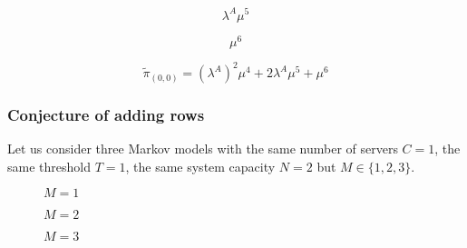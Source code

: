 \begin{multicols}{4}
    \begin{figure}[H]
        \centering
        \scalebox{0.6}{}
    \end{figure}
    \vspace*{\fill}
    \columnbreak
    \vspace*{0.3cm}
    \begin{equation*}
        \lambda^A \mu^5
    \end{equation*}
    \vspace*{\fill}
    \columnbreak
    \begin{figure}[H]
        \centering
        \scalebox{0.6}{}
    \end{figure}
    \vspace*{\fill}
    \columnbreak
    \vspace*{0.3cm}
    \begin{equation*}
        \mu^6
    \end{equation*}
\end{multicols}


\begin{equation*}
    \tilde{\pi}_{(0,0)} = (\lambda^A)^2 \mu^4 + 2 \lambda^A \mu^5 + \mu^6
\end{equation*}

\newpage
\subsubsection{Conjecture of adding rows}

Let us consider three Markov models with the same number of servers \(C=1\), the same threshold \(T=1\), the same system capacity \(N=2\) but \(M\in\{1, 2, 3\}\).


\begin{multicols}{3}
    \begin{figure}[H]
        \centering
        \scalebox{0.8}{}
        \caption{\(M=1\)}
    \end{figure}
    \columnbreak
    \begin{figure}[H]
        \centering
        \scalebox{0.8}{}
        \caption{\(M=2\)}
    \end{figure}
    \begin{figure}[H]
        \centering
        \scalebox{0.8}{}
        \caption{\(M=3\)}
    \end{figure}
\end{multicols}

